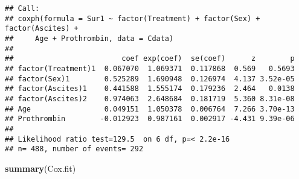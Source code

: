 \documentclass[
]{article}
\newenvironment{Shaded}{\begin{snugshade}}{\end{snugshade}}
\newcommand{\CommentTok}[1]{\textcolor[rgb]{0.56,0.35,0.01}{\textit{#1}}}
\newcommand{\DataTypeTok}[1]{\textcolor[rgb]{0.13,0.29,0.53}{#1}}
\newcommand{\KeywordTok}[1]{\textcolor[rgb]{0.13,0.29,0.53}{\textbf{#1}}}
\newcommand{\NormalTok}[1]{#1}
\newcommand{\OperatorTok}[1]{\textcolor[rgb]{0.81,0.36,0.00}{\textbf{#1}}}
\newcommand{\StringTok}[1]{\textcolor[rgb]{0.31,0.60,0.02}{#1}}
\begin{document}
\begin{Shaded}
\end{Shaded}

\begin{verbatim}
## Call:
## coxph(formula = Sur1 ~ factor(Treatment) + factor(Sex) + factor(Ascites) + 
##     Age + Prothrombin, data = Cdata)
## 
##                         coef exp(coef)  se(coef)      z        p
## factor(Treatment)1  0.067070  1.069371  0.117868  0.569   0.5693
## factor(Sex)1        0.525289  1.690948  0.126974  4.137 3.52e-05
## factor(Ascites)1    0.441588  1.555174  0.179236  2.464   0.0138
## factor(Ascites)2    0.974063  2.648684  0.181719  5.360 8.31e-08
## Age                 0.049151  1.050378  0.006764  7.266 3.70e-13
## Prothrombin        -0.012923  0.987161  0.002917 -4.431 9.39e-06
## 
## Likelihood ratio test=129.5  on 6 df, p=< 2.2e-16
## n= 488, number of events= 292
\end{verbatim}

\begin{Shaded}
\begin{Highlighting}[]
\KeywordTok{summary}\NormalTok{(Cox.fit)}
\end{Highlighting}
\end{Shaded}
\end{document}
